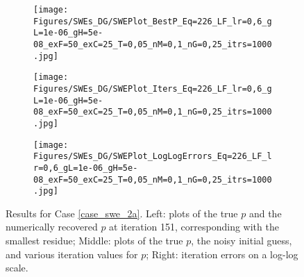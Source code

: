 \begin{figure}[h]
    \begin{subfigure}[t]{0.32\textwidth}
        \centering
        \texttt{[image: Figures/SWEs\_DG/SWEPlot\_BestP\_Eq=226\_LF\_lr=0,6\_gL=1e-06\_gH=5e-08\_exF=50\_exC=25\_T=0,05\_nM=0,1\_nG=0,25\_itrs=1000.jpg]}
    \end{subfigure}
    \begin{subfigure}[t]{0.32\textwidth}
        \centering
        \texttt{[image: Figures/SWEs\_DG/SWEPlot\_Iters\_Eq=226\_LF\_lr=0,6\_gL=1e-06\_gH=5e-08\_exF=50\_exC=25\_T=0,05\_nM=0,1\_nG=0,25\_itrs=1000.jpg]}
    \end{subfigure}
    \begin{subfigure}[t]{0.32\textwidth}
        \texttt{[image: Figures/SWEs\_DG/SWEPlot\_LogLogErrors\_Eq=226\_LF\_lr=0,6\_gL=1e-06\_gH=5e-08\_exF=50\_exC=25\_T=0,05\_nM=0,1\_nG=0,25\_itrs=1000.jpg]}
    \end{subfigure}
    \caption{Results for Case \eqref{case_swe_2a}. Left: plots of the true $p$ and the numerically recovered $p$ at iteration 151, corresponding with the smallest residue; Middle: plots of the true $p$, the noisy initial guess, and various iteration values for $p$; Right: iteration errors on a log-log scale.}
    \label{fig:swe_2A}
\end{figure}

